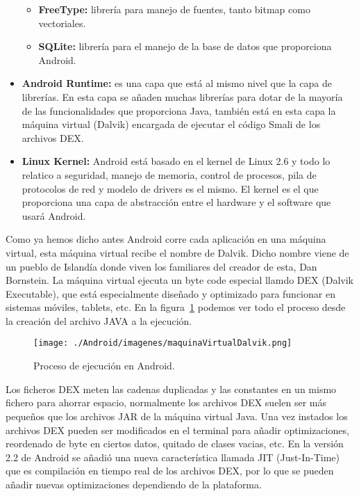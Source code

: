 \begin{itemize}
\begin{itemize}
	\item \textbf{FreeType:} librería para manejo de fuentes, tanto bitmap como vectoriales.

	\item \textbf{SQLite:} librería para el manejo de la base de datos que proporciona Android.

\end{itemize}

\item \textbf{Android Runtime:} es una capa que está al mismo nivel que la capa de librerías. En esta capa se añaden muchas librerías para dotar de la mayoría de las funcionalidades que proporciona Java, también está en esta capa la máquina virtual (Dalvik) encargada de ejecutar el código Smali de los archivos DEX.

\item \textbf{Linux Kernel:} Android está basado en el kernel de Linux 2.6 y todo lo relatico a seguridad, manejo de memoria, control de procesos, pila de protocolos de red y modelo de drivers es el mismo. El kernel es el que proporciona una capa de abstracción entre el hardware y el software que usará Android.

\end{itemize}

Como ya hemos dicho antes Android corre cada aplicación en una máquina virtual, esta máquina virtual recibe el nombre de Dalvik. Dicho nombre viene de un pueblo de Islandía donde viven los familiares del creador de esta, Dan Bornstein. La máquina virtual ejecuta un byte code especial llamdo DEX (Dalvik Executable), que está especialmente diseñado y optimizado para funcionar en sistemas móviles, tablets, etc. En la figura~\ref{fig:maquinaVirtualDalvik} podemos ver todo el proceso desde la creación del archivo JAVA a la ejecución.

\begin{figure}[h]
  \centering
    \texttt{[image: ./Android/imagenes/maquinaVirtualDalvik.png]}
  \caption{Proceso de ejecución en Android.}
  \label{fig:maquinaVirtualDalvik}
\end{figure}


Los ficheros DEX meten las cadenas duplicadas y las constantes en un mismo fichero para ahorrar espacio, normalmente los archivos DEX suelen ser más pequeños que los archivos JAR de la máquina virtual Java. Una vez instados los archivos DEX pueden ser modificados en el terminal para añadir optimizaciones, reordenado de byte en ciertos datos, quitado de clases vacias, etc. En la versión 2.2 de Android se añadió una nueva característica llamada JIT (Just-In-Time) que es compilación en tiempo real de los archivos DEX, por lo que se pueden añadir nuevas optimizaciones dependiendo de la plataforma.

